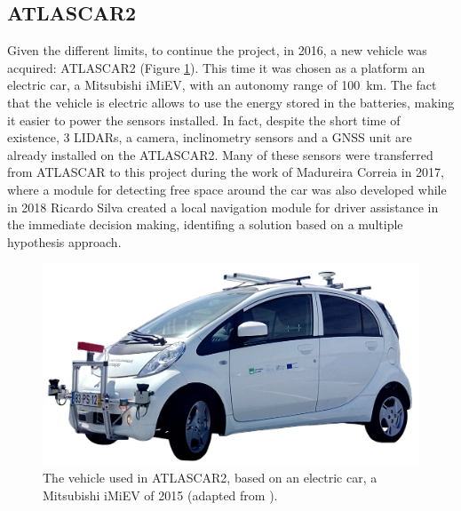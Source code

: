 \subsection{ATLASCAR2}\label{sec:ATLASCAR2}
Given the different limits, to continue the project, in 2016, a new vehicle was acquired: ATLASCAR2 (Figure \ref{fig:atlascar2}). This time it was chosen as a platform
an electric car, a Mitsubishi iMiEV, with an autonomy range of \SI{100}{km}. The fact that the vehicle is electric allows to use the energy stored in the batteries, making it easier to power the sensors installed. In fact, despite the short time of existence, 3 LIDARs, a camera, inclinometry sensors and a GNSS unit are already installed on the ATLASCAR2. Many of these sensors were transferred from ATLASCAR to this project during the work of Madureira Correia \cite{Madureira2017} in 2017, where a module for detecting free space around the car was also developed while in 2018 Ricardo Silva \cite{Ricardo:Thesis:2018} created a local navigation module for driver assistance in the immediate decision making, identifing a solution based on a multiple hypothesis approach.
\begin{figure}[!h]
	\centering
	\includegraphics[width=\textwidth]{../figure/atlascar2.jpg}
	\caption{The vehicle used in ATLASCAR2, based on an electric car, a Mitsubishi iMiEV of 2015 (adapted from \cite{Ricardo:Thesis:2018}).}
	\label{fig:atlascar2}
\end{figure}

